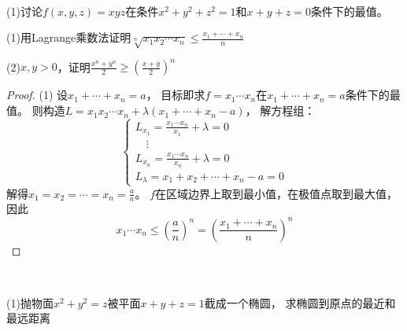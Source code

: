 ~

\begin{exercise}[Lagrange乘数法的直接使用]
  (1)讨论$f(x,y,z) = xyz$在条件$x^2 + y^2 + z^2 = 1$和$x+y+z = 0$条件下的最值。
\end{exercise}




\begin{exercise}[Lagrange乘数法证明不等式]
  (1)用Lagrange乘数法证明$\sqrt[n]{x_1x_2\cdots x_n} \leq \frac{x_1 + \cdots + x_n}{n}$

  (2)$x,y > 0$，证明$\frac{x^n + y^n}{2} \geq \left( \frac{x+y}{2} \right)^n$
\end{exercise}

\begin{proof}
  (1)
  设$x_1 + \cdots + x_n = a$，
  目标即求$f = x_1\cdots x_n$在$x_1 + \cdots + x_n = a$条件下的最值。
  则构造$L = x_1x_2 \cdots x_n + \lambda(x_1 + \cdots + x_n - a)$，
  解方程组：
  \begin{equation*}
    \begin{cases}
      L_{x_1} = \frac{x_1 \cdots x_n}{x_1} + \lambda = 0\\
      \quad \vdots\\
      L_{x_n} = \frac{x_1 \cdots x_n}{x_n} + \lambda = 0\\
      L_{\lambda} = x_1 + x_2 + \cdots + x_n - a = 0
    \end{cases}
  \end{equation*}
  解得$x_1 = x_2 = \cdots = x_n = \frac{a}{n}$。
  $f$在区域边界上取到最小值，在极值点取到最大值，因此
  \begin{equation*}
    x_1 \cdots x_n \leq \left( \frac{a}{n} \right)^n = \left( \frac{x_1 + \cdots + x_n}{n} \right)^n
  \end{equation*}
\end{proof}

~

\begin{exercise}[Lagrange乘数法的应用]
  (1)抛物面$x^2 + y^2 = z$被平面$x+y+z = 1$截成一个椭圆，
  求椭圆到原点的最近和最远距离
\end{exercise}

